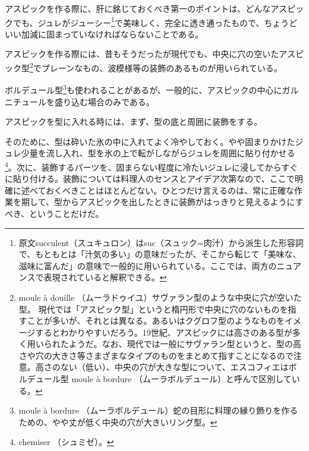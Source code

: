 

アスピックを作る際に、肝に銘じておくべき第一のポイントは、どんなアスピックでも、ジュレがジューシー\footnote{原文succulent（スュキュロン）はsuc（スュック=肉汁）から派生した形容詞で、もともとは「汁気の多い」の意味だったが、そこから転じて「美味な、滋味に富んだ」の意味で一般的に用いられている。ここでは、両方のニュアンスで表現されていると解釈できる。}で美味しく、完全に透き通ったもので、ちょうどいい加減に固まっていなければならないことである。

アスピックを作る際には、昔もそうだったが現代でも、中央に穴の空いたアスピック型\footnote{moule
  à douille （ムーラドゥイユ）サヴァラン型のような中央に穴が空いた型。
  現代では「アスピック型」というと楕円形で中央に穴のないものを指すことが多いが、それとは異なる。あるいはクグロフ型のようなものをイメージするとわかりやすいだろう。19世紀、アスピックには高さのある型が多く用いられたようだ。なお、現代では一般にサヴァラン型というと、型の高さや穴の大きさ等さまざまなタイプのものをまとめて指すことになるので注意。高さのない（低い）、中央の穴が大きな型について、エスコフィエはボルデュール型
  moule à bordure （ムーラボルデュール）と呼んで区別している。}でプレーンなもの、波模様等の装飾のあるものが用いられている。

ボルデュール型\footnote{moule à bordure
  （ムーラボルデュール）蛇の目形に料理の縁り飾りを作るための、やや丈が低く中央の穴が大きいリング型。}も使われることがあるが、一般的に、アスピックの中心にガルニチュールを盛り込む場合のみである。

アスピックを型に入れる時には、まず、型の底と周囲に装飾をする。

そのために、型は砕いた氷の中に入れてよく冷やしておく。やや固まりかけたジュレ少量を流し入れ、型を氷の上で転がしながらジュレを周囲に貼り付かせる\footnote{chemiser
  （シュミゼ）。}。次に、装飾するパーツを、固まらない程度に冷たいジュレに浸してからすぐに貼り付ける。装飾については料理人のセンスとアイデア次第なので、ここで明確に述べておくべきことはほとんどない。ひとつだけ言えるのは、常に正確な作業を期して、型からアスピックを出したときに装飾がはっきりと見えるようにすべき、ということだけだ。

